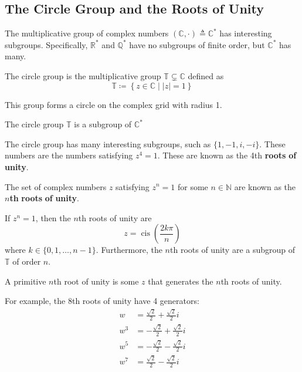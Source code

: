 \documentclass[12pt, letterpaper]{report}
\DeclareMathOperator{\cis}{cis}
\begin{document}
\subsection*{The Circle Group and the Roots of Unity}
The multiplicative group of complex numbers \((\mathbb{C} ,\cdot)\triangleq\mathbb{C} ^*\) has interesting subgroups. Specifically, \(\mathbb{R} ^*\) and \(\mathbb{Q} ^*\) have no subgroups of finite order, but \(\mathbb{C} ^*\) has many. 
\begin{definition}\label{circlegroup}
	The circle group is the multiplicative group \(\mathbb{T} \subsetneq \mathbb{C} \) defined as 
	\[
		\mathbb{T} \coloneqq \left\{ z\in\mathbb{C} \mid |z| = 1 \right\} 
	\]
\end{definition}
\begin{remark}
	This group forms a circle on the complex grid with radius 1.
\end{remark}
\begin{proposition}
	The circle group \(\mathbb{T} \) is a subgroup of \(\mathbb{C} ^*\) 
\end{proposition}
The circle group has many interesting subgroups, such as \(\{ 1,-1,i,-i \} \). These numbers are the numbers satisfying \(z^4 =1\). These are known as the 4th \textbf{roots} \textbf{of} \textbf{unity}. 
\begin{definition}
	The set of complex numbers \(z\) satisfying \(z^n =1\) for some \(n\in\mathbb{N} \) are known as the \(n\)\textbf{th} \textbf{roots} \textbf{of} \textbf{unity}.
\end{definition}
\begin{theorem}
	If \(z^n =1\), then the \(n\)th roots of unity are 
	\[z=\cis \left( \frac{2k \pi }{n} \right) \]
	where \(k\in\{ 0,1,\ldots,n-1 \} \). Furthermore, the \(n\)th roots of unity are a subgroup of \(\mathbb{T} \) of order \(n\).
\end{theorem}
\begin{definition}
	A primitive \(n\)th root of unity is some \(z\) that generates the \(n\)th roots of unity.
\end{definition}
For example, the 8th roots of unity have 4 generators: 
\begin{align*}
	w&=\frac{\sqrt{2} }{2}+\frac{\sqrt{2} }{2}i\\
	w^3 &=-\frac{\sqrt{2} }{2}+\frac{\sqrt{2} }{2}i\\
	w^5 &=-\frac{\sqrt{2} }{2} -\frac{\sqrt{2} }{2}i\\
	w^7 &=\frac{\sqrt{2} }{2}-\frac{\sqrt{2} }{2}i
\end{align*}
\end{document}

